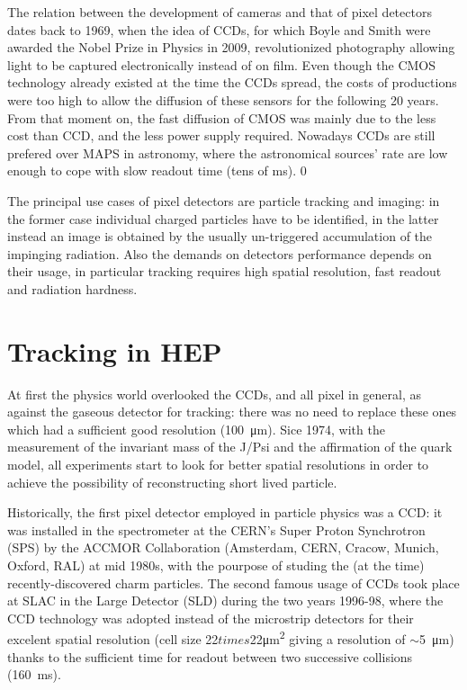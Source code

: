 The relation between the development of cameras and that of pixel detectors dates back to 1969, when the idea of CCDs, for which Boyle and Smith were awarded the Nobel Prize in Physics in 2009, revolutionized photography allowing light to be captured electronically instead of on film. 
Even though the CMOS technology already existed at the time the CCDs spread, the costs of productions were too high to allow the diffusion of these sensors for the following 20 years. From that moment on, the fast diffusion of CMOS was mainly due to the less cost than CCD, and the less power supply required. Nowadays CCDs are still prefered over MAPS in astronomy, where the astronomical sources' rate are low enough to cope with slow readout time (tens of \si{ms}).  0

The principal use cases of pixel detectors are particle tracking and imaging: in the former case individual charged particles have to be identified, in the latter instead an image is obtained by the usually un-triggered accumulation of the impinging radiation. 
Also the demands on detectors performance depends on their usage, in particular tracking requires high spatial resolution, fast readout and radiation hardness. 

\section{Tracking in HEP}
    At first the physics world overlooked the CCDs, and all pixel in general, as against the gaseous detector for tracking: there was no need to replace these ones which had a sufficient good resolution (\SI{100}{\um}). Sice 1974, with the measurement of the invariant mass of the J/Psi and the affirmation of the quark model, all experiments start to look for better spatial resolutions in order to achieve the possibility of reconstructing short lived particle.  

    Historically, the first pixel detector employed in particle physics was a CCD: it was installed in the spectrometer at the CERN’s Super Proton Synchrotron (SPS) by the ACCMOR Collaboration (Amsterdam, CERN, Cracow, Munich, Oxford, RAL) at mid 1980s, with the pourpose of studing the (at the time) recently-discovered charm particles.
    The second famous usage of CCDs took place at SLAC in the Large Detector (SLD) during the two years 1996-98, where the CCD technology was adopted instead of the microstrip detectors for their excelent spatial resolution (cell size 22$times$22\si{\um\squared} giving a resolution of $\sim$\SI{5}{\um}) thanks to the sufficient time for readout between two successive collisions (\SI{160}{ms}).

